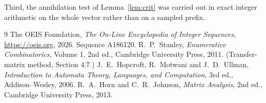 \documentclass[11pt,a4paper]{article}
\theoremstyle{plain}
\theoremstyle{definition}
\begin{document}
Third, the annihilation test of Lemma~\ref{lem:crit} was carried out in exact integer
arithmetic on the whole vector rather than on a sampled prefix.

\begin{thebibliography}{9}
 The OEIS Foundation, \emph{The On-Line Encyclopedia of Integer
Sequences}, \url{https://oeis.org}, 2026. Sequence A186120.
 R.~P.~Stanley, \emph{Enumerative Combinatorics}, Volume 1, 2nd ed.,
Cambridge University Press, 2011. (Transfer-matrix method, Section 4.7.)
 J.~E.~Hopcroft, R.~Motwani and J.~D.~Ullman, \emph{Introduction to Automata
Theory, Languages, and Computation}, 3rd ed., Addison--Wesley, 2006.
 R.~A.~Horn and C.~R.~Johnson, \emph{Matrix Analysis}, 2nd ed., Cambridge
University Press, 2013.
\end{thebibliography}
\end{document}
